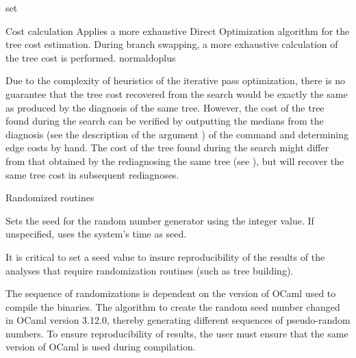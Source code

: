 \begin{command}{set}{}
\begin{arguments}
\begin{argumentgroup}{Cost calculation}
                {Applies a more exhaustive Direct Optimization algorithm for the tree cost estimation. 
                During branch swapping, a more exhaustive calculation of the tree cost is performed.}
                {normaldoplus}
                
            
                
	\begin{statement}
  	  Due to the complexity of heuristics of the iterative pass optimization, 
	  there is no guarantee that the tree cost recovered from the search 
	  would be exactly the same as produced by the diagnosis of the same tree. 
	  However, the cost of the tree found during the search can be verified by 
	  outputting the medians from the diagnosis (see the description of the argument 
	  ) of the command  
	  and determining edge costs by hand. The cost of the tree found during the 
	  search might differ from that obtained by the rediagnosing the same tree 
	  (see ), but will
	  recover the same tree cost in subsequent rediagnoses.

  \end{statement}
	
        \end{argumentgroup}

        \begin{argumentgroup}{Randomized routines}
            {}

                {Sets the seed for the random number generator using the integer 
                value. If unspecified, \poy uses the system's time as seed.}
                {}
        	\begin{statement}
  	 It is critical to set a seed value to insure reproducibility of the results
	 of the analyses that require randomization routines (such as tree
	 building). 
	 \end{statement}
	 
	 \begin{statement}
	 The sequence of randomizations is dependent on the version of OCaml
	 used to compile the binaries. The algorithm to create the random seed 
	 number changed in OCaml version 3.12.0, thereby generating different
	 sequences of pseudo-random numbers.  To ensure reproducibility
	 of results, the user must ensure that the same version of OCaml is used 
	 during compilation.
	\end{statement}
	

\end{argumentgroup}
\end{arguments}
\end{command}
